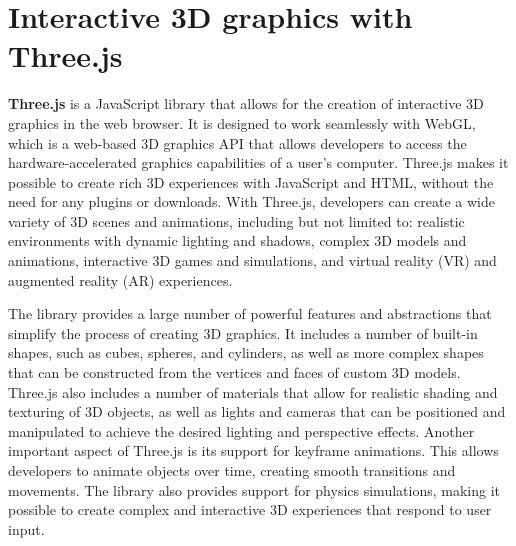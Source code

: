 \section{Interactive 3D graphics with Three.js}
\textbf{Three.js}\cite{threejs} is a JavaScript library that allows for the creation of interactive 3D graphics in the web 
browser. It is designed to work seamlessly with WebGL, which is a web-based 3D graphics API that allows 
developers to access the hardware-accelerated graphics capabilities of a user's computer. Three.js 
makes it possible to create rich 3D experiences with JavaScript and HTML, without the need for any plugins or downloads.
With Three.js, developers can create a wide variety of 3D scenes and animations, including but not limited to: 
realistic environments with dynamic lighting and shadows, complex 3D models and animations, interactive 3D 
games and simulations, and virtual reality (VR) and augmented reality (AR) experiences.

The library provides a large number of powerful features and abstractions that simplify 
the process of creating 3D graphics. It includes a number of built-in shapes, such as cubes, 
spheres, and cylinders, as well as more complex shapes that can be constructed from the 
vertices and faces of custom 3D models. Three.js also includes a number of materials that 
allow for realistic shading and texturing of 3D objects, as well as lights and cameras 
that can be positioned and manipulated to achieve the desired lighting and perspective effects.
Another important aspect of Three.js is its support for keyframe animations. This allows
developers to animate objects over time, creating smooth transitions and movements. 
The library also provides support for physics simulations, making it possible to 
create complex and interactive 3D experiences that respond to user input.

